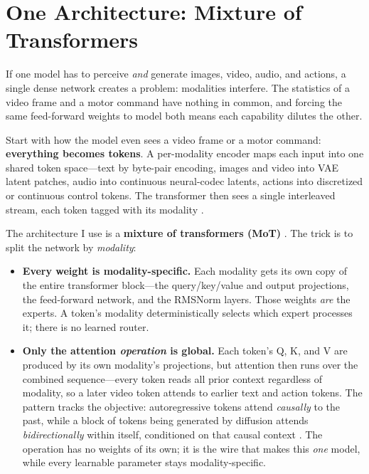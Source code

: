 \documentclass[10pt,conference]{IEEEtran}
\begin{document}
\section{One Architecture: Mixture of Transformers}
If one model has to perceive \emph{and} generate images, video, audio, and
actions, a single dense network creates a problem: modalities interfere. The
statistics of a video frame and a motor command have nothing in common, and
forcing the same feed-forward weights to model both means each capability dilutes
the other.

Start with how the model even sees a video frame or a motor command:
\textbf{everything becomes tokens}. A per-modality encoder maps each input into
one shared token space---text by byte-pair encoding, images and video into VAE
latent patches, audio into continuous neural-codec latents, actions into discretized or
continuous control tokens. The transformer then sees a single interleaved stream,
each token tagged with its modality \cite{ref3,ref8}.

The architecture I use is a \textbf{mixture of transformers (MoT)}
\cite{ref1}. The trick is to split the network by \emph{modality}:

\begin{itemize}
\item \textbf{Every weight is modality-specific.} Each modality gets its own copy
of the entire transformer block---the query/key/value and output projections, the
feed-forward network, and the RMSNorm layers. Those weights \emph{are} the
experts. A token's modality deterministically selects which expert processes it;
there is no learned router.
\item \textbf{Only the attention \emph{operation} is global.} Each token's Q, K,
and V are produced by its own modality's projections, but attention then runs
over the combined sequence---every token reads all prior context regardless of
modality, so a later video token attends to earlier text and action tokens. The
pattern tracks the objective: autoregressive tokens attend \emph{causally} to the
past, while a block of tokens being generated by diffusion attends
\emph{bidirectionally} within itself, conditioned on that causal context
\cite{ref2,ref4,ref10}. The operation has no weights of its own; it is the wire that
makes this \emph{one} model, while every learnable parameter stays
modality-specific.
\end{itemize}
\end{document}
